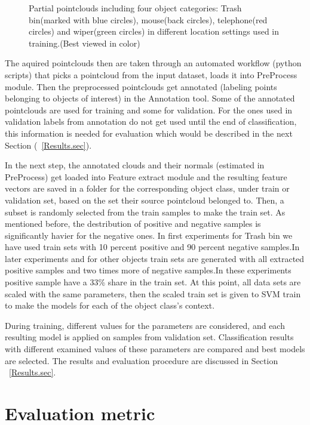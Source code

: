 \begin{figure} [htp]
\begin{center}
  \end{center}
  \caption[Train set pointclouds including four different object class.]
  {Partial pointclouds including four object categories: Trash bin(marked with blue circles), mouse(back circles), telephone(red circles) and wiper(green circles) in different location settings used in training.(Best viewed in color)}
  \label{TrainClouds2.figure:edge}
\end{figure}




The aquired pointclouds then are taken through an automated workflow (python scripts) that picks a pointcloud from the input dataset, loads it into PreProcess module. Then the preprocessed pointclouds get annotated (labeling points belonging to objects of interest) in the Annotation tool.
Some of the annotated pointclouds are used for training and some for validation. 
For the ones used in validation labels from annotation do not get used until the end of classification, this information is needed for evaluation which would be described in the next Section (~\ref{Results.sec}).


In the next step, the annotated clouds and their normals (estimated in PreProcess) get loaded into Feature extract module 
and the resulting feature vectors are saved in a folder for the corresponding object class, under train or validation set, based on the set their source pointcloud belonged to.
Then, a subset is randomly selected from the train samples to make the train set. As mentioned before, the destribution of positive and negative samples is significantly havier for the negative ones. In first experiments for Trash bin we have used train sets with 10 percent positive and 90 percent negative samples.In later experiments and for other objects train sets are generated with all extracted positive samples and two times more of negative samples.In these experiments positive sample have a 33\% share in the train set. At this point, all data sets are scaled with the same parameters, then the scaled train set is given to SVM train to make the models for each of the object class's context. 


During training, different values for the parameters are considered, and each resulting model is applied on samples from validation
set. Classification results with different examined values of these parameters are compared and best models are selected. 
The results and evaluation procedure are discussed in Section ~\ref{Results.sec}.

\section{Evaluation metric}
\label{EvaluationMetric.sec}

